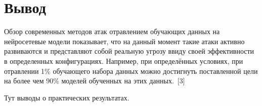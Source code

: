 \section*{Вывод}
Обзор современных методов атак отравлением обучающих данных на нейросетевые модели показывает, что на данный момент такие атаки активно развиваются и представляют собой реальную угрозу ввиду своей эффективности в определенных конфигурациях. Например, при определённых условиях, при отравлении 1\% обучающего набора данных можно достигнуть поставленной цели на более чем 90\% моделей обученных на этих данных.~[3]


Тут выводы о практических результатах.